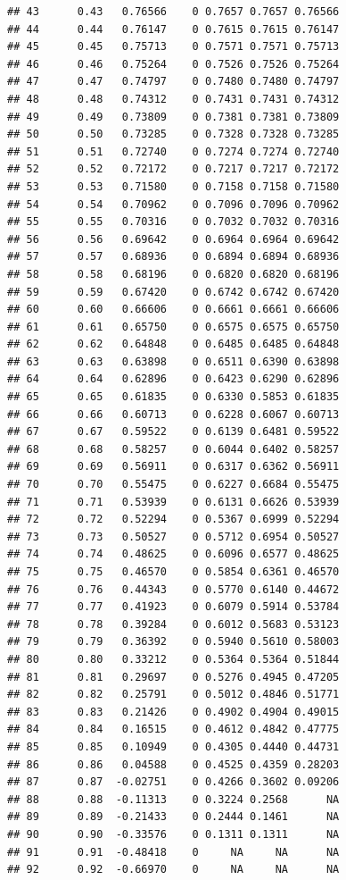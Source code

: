\documentclass{article}\usepackage[]{graphicx}\usepackage[]{color}
\makeatletter
\newenvironment{kframe}{%
 \def\at@end@of@kframe{}%
 \ifinner\ifhmode%
  \def\at@end@of@kframe{\end{minipage}}%
  \begin{minipage}{\columnwidth}%
 \fi\fi%
 \def\FrameCommand##1{\hskip\@totalleftmargin \hskip-\fboxsep
 \colorbox{shadecolor}{##1}\hskip-\fboxsep
     \hskip-\linewidth \hskip-\@totalleftmargin \hskip\columnwidth}%
 \MakeFramed {\advance\hsize-\width
   \@totalleftmargin\z@ \linewidth\hsize
   \@setminipage}}%
 {\par\unskip\endMakeFramed%
 \at@end@of@kframe}
\newenvironment{knitrout}{}{} %
\makeatother
\begin{document}
\begin{knitrout}
\begin{kframe}
\begin{verbatim}
## 43      0.43   0.76566    0 0.7657 0.7657 0.76566
## 44      0.44   0.76147    0 0.7615 0.7615 0.76147
## 45      0.45   0.75713    0 0.7571 0.7571 0.75713
## 46      0.46   0.75264    0 0.7526 0.7526 0.75264
## 47      0.47   0.74797    0 0.7480 0.7480 0.74797
## 48      0.48   0.74312    0 0.7431 0.7431 0.74312
## 49      0.49   0.73809    0 0.7381 0.7381 0.73809
## 50      0.50   0.73285    0 0.7328 0.7328 0.73285
## 51      0.51   0.72740    0 0.7274 0.7274 0.72740
## 52      0.52   0.72172    0 0.7217 0.7217 0.72172
## 53      0.53   0.71580    0 0.7158 0.7158 0.71580
## 54      0.54   0.70962    0 0.7096 0.7096 0.70962
## 55      0.55   0.70316    0 0.7032 0.7032 0.70316
## 56      0.56   0.69642    0 0.6964 0.6964 0.69642
## 57      0.57   0.68936    0 0.6894 0.6894 0.68936
## 58      0.58   0.68196    0 0.6820 0.6820 0.68196
## 59      0.59   0.67420    0 0.6742 0.6742 0.67420
## 60      0.60   0.66606    0 0.6661 0.6661 0.66606
## 61      0.61   0.65750    0 0.6575 0.6575 0.65750
## 62      0.62   0.64848    0 0.6485 0.6485 0.64848
## 63      0.63   0.63898    0 0.6511 0.6390 0.63898
## 64      0.64   0.62896    0 0.6423 0.6290 0.62896
## 65      0.65   0.61835    0 0.6330 0.5853 0.61835
## 66      0.66   0.60713    0 0.6228 0.6067 0.60713
## 67      0.67   0.59522    0 0.6139 0.6481 0.59522
## 68      0.68   0.58257    0 0.6044 0.6402 0.58257
## 69      0.69   0.56911    0 0.6317 0.6362 0.56911
## 70      0.70   0.55475    0 0.6227 0.6684 0.55475
## 71      0.71   0.53939    0 0.6131 0.6626 0.53939
## 72      0.72   0.52294    0 0.5367 0.6999 0.52294
## 73      0.73   0.50527    0 0.5712 0.6954 0.50527
## 74      0.74   0.48625    0 0.6096 0.6577 0.48625
## 75      0.75   0.46570    0 0.5854 0.6361 0.46570
## 76      0.76   0.44343    0 0.5770 0.6140 0.44672
## 77      0.77   0.41923    0 0.6079 0.5914 0.53784
## 78      0.78   0.39284    0 0.6012 0.5683 0.53123
## 79      0.79   0.36392    0 0.5940 0.5610 0.58003
## 80      0.80   0.33212    0 0.5364 0.5364 0.51844
## 81      0.81   0.29697    0 0.5276 0.4945 0.47205
## 82      0.82   0.25791    0 0.5012 0.4846 0.51771
## 83      0.83   0.21426    0 0.4902 0.4904 0.49015
## 84      0.84   0.16515    0 0.4612 0.4842 0.47775
## 85      0.85   0.10949    0 0.4305 0.4440 0.44731
## 86      0.86   0.04588    0 0.4525 0.4359 0.28203
## 87      0.87  -0.02751    0 0.4266 0.3602 0.09206
## 88      0.88  -0.11313    0 0.3224 0.2568      NA
## 89      0.89  -0.21433    0 0.2444 0.1461      NA
## 90      0.90  -0.33576    0 0.1311 0.1311      NA
## 91      0.91  -0.48418    0     NA     NA      NA
## 92      0.92  -0.66970    0     NA     NA      NA

\end{verbatim}
\end{kframe}
\end{knitrout}
\end{document}
